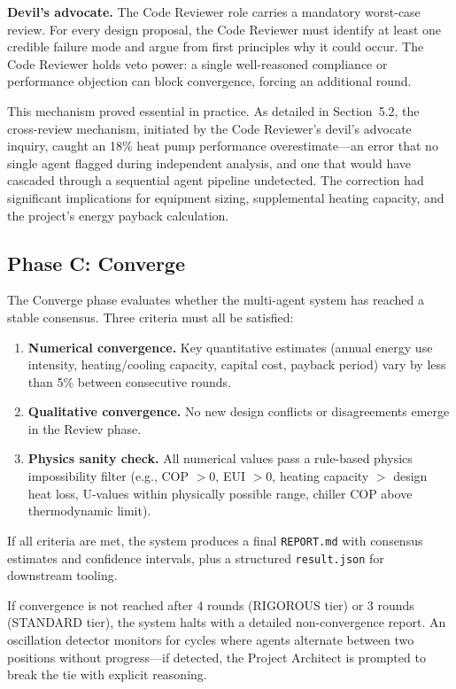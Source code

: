 \documentclass[11pt,a4paper]{article}
\begin{document}
\textbf{Devil's advocate.} The Code Reviewer role carries a mandatory worst-case review. For every design proposal, the Code Reviewer must identify at least one credible failure mode and argue from first principles why it could occur. The Code Reviewer holds veto power: a single well-reasoned compliance or performance objection can block convergence, forcing an additional round.

This mechanism proved essential in practice. As detailed in Section~5.2, the cross-review mechanism, initiated by the Code Reviewer's devil's advocate inquiry, caught an 18\% heat pump performance overestimate---an error that no single agent flagged during independent analysis, and one that would have cascaded through a sequential agent pipeline undetected. The correction had significant implications for equipment sizing, supplemental heating capacity, and the project's energy payback calculation.

\subsection{Phase C: Converge}

The Converge phase evaluates whether the multi-agent system has reached a stable consensus. Three criteria must all be satisfied:

\begin{enumerate}
    \item \textbf{Numerical convergence.} Key quantitative estimates (annual energy use intensity, heating/cooling capacity, capital cost, payback period) vary by less than 5\% between consecutive rounds.
    \item \textbf{Qualitative convergence.} No new design conflicts or disagreements emerge in the Review phase.
    \item \textbf{Physics sanity check.} All numerical values pass a rule-based physics impossibility filter (e.g., COP $> 0$, EUI $> 0$, heating capacity $>$ design heat loss, U-values within physically possible range, chiller COP above thermodynamic limit).
\end{enumerate}

If all criteria are met, the system produces a final \texttt{REPORT.md} with consensus estimates and confidence intervals, plus a structured \texttt{result.json} for downstream tooling.

If convergence is not reached after 4 rounds (RIGOROUS tier) or 3 rounds (STANDARD tier), the system halts with a detailed non-convergence report. An oscillation detector monitors for cycles where agents alternate between two positions without progress---if detected, the Project Architect is prompted to break the tie with explicit reasoning.
\end{document}
